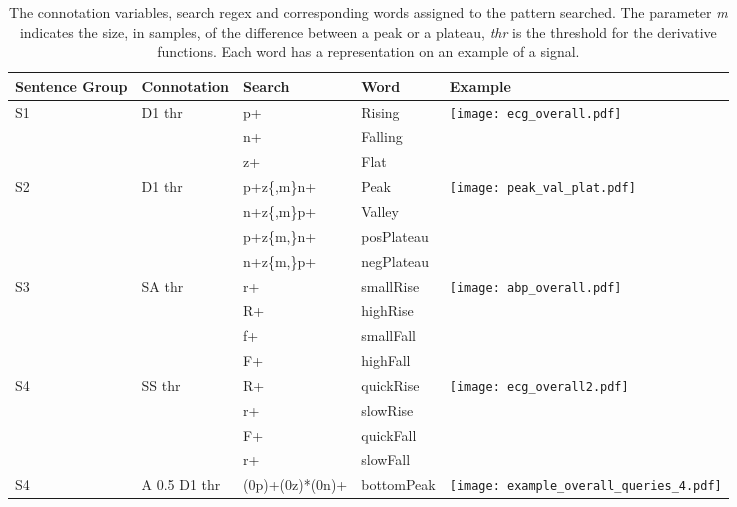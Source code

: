 \begin{table}
\begin{center}
\caption{The connotation variables, search \gls{regex} and corresponding words assigned to the pattern searched. The parameter \textit{m} indicates the size, in samples, of the difference between a peak or a plateau, \textit{thr} is the threshold for the derivative functions. Each word has a representation on an example of a signal.}
\renewcommand{\arraystretch}{1.2}
\begin{tabularx}{\linewidth}{ XXXXX } 
\toprule[1.5pt]
Sentence Group & Connotation & Search & Word & Example\\
\toprule
  \multirow{3}{1em}{S1} & \multirow{3}{3em}{D1 thr} & p+ & \textcolor{mygreen2}{Rising} &  \multirow{3}{9em}{\texttt{[image: ecg\_overall.pdf]}}\\ 
  & & n+ & \textcolor{myblue2}{Falling} & \\ 
  & & z+ & \textcolor{myorange}{Flat} & \\
\hline
 \multirow{4}{1em}{S2} & \multirow{4}{6em}{D1 thr} & p+z\{,m\}n+ & \textcolor{myblue2}{Peak} & \multirow{4}{9em}{\texttt{[image: peak\_val\_plat.pdf]}}\\
 & & n+z\{,m\}p+ & \textcolor{myorange}{Valley}\\
 & & p+z\{m,\}n+ & \textcolor{mypurple}{posPlateau}\\
 & & n+z\{m,\}p+ & \textcolor{mygreen2}{negPlateau}\\
\hline
\multirow{4}{1em}{S3} & \multirow{4}{6em}{SA thr} & r+ & \textcolor{mypurple}{smallRise} & \multirow{4}{9em}{\texttt{[image: abp\_overall.pdf]}}\\
 & & R+ & \textcolor{myblue2}{highRise}\\
 & & f+ & \textcolor{mygreen2}{smallFall}\\
 & & F+ & \textcolor{myorange}{highFall}\\
\hline
\multirow{4}{1em}{S4} & \multirow{4}{6em}{SS thr} & R+ & \textcolor{mygreen2}{quickRise} & \multirow{4}{9em}{\texttt{[image: ecg\_overall2.pdf]}}\\
  & & r+ & \textcolor{mypurple}{slowRise}\\
  & & F+ & \textcolor{myblue2}{quickFall}\\
 & & r+ & \textcolor{myorange}{slowFall}\\
\hline
\multirow{4}{1em}{S4} & \multirow{4}{6em}{A 0.5 D1 thr} & (0p)+(0z)*(0n)+ & \textcolor{mygreen2}{bottomPeak} & \multirow{4}{9em}{\texttt{[image: example\_overall\_queries\_4.pdf]}}\\

\end{tabularx}
\end{center}
\end{table}
